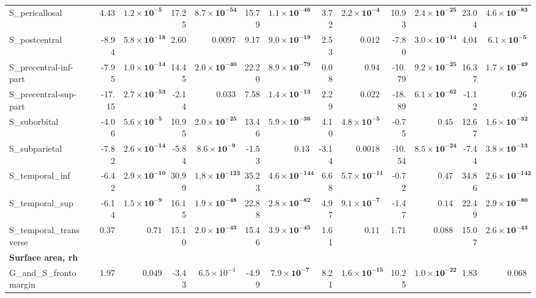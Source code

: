 {\begin{longtable}{llrrrrrrrrrrrr}
S\_pericallosal &  & 4.43 & $\mathbf{1.2{\times}10^{-5}}$ & 17.25 & $\mathbf{8.7{\times}10^{-54}}$ & 15.79 & $\mathbf{1.1{\times}10^{-46}}$ & 3.72 & $\mathbf{2.2{\times}10^{-4}}$ & 10.93 & $\mathbf{2.4{\times}10^{-25}}$ & 23.04 & $\mathbf{4.6{\times}10^{-83}}$ \\
S\_postcentral &  & -8.94 & $\mathbf{5.8{\times}10^{-18}}$ & 2.60 & $0.0097$ & 9.17 & $\mathbf{9.0{\times}10^{-19}}$ & 2.53 & $0.012$ & -7.80 & $\mathbf{3.0{\times}10^{-14}}$ & 4.04 & $\mathbf{6.1{\times}10^{-5}}$ \\
S\_precentral-inf-part &  & -7.95 & $\mathbf{1.0{\times}10^{-14}}$ & 14.45 & $\mathbf{2.0{\times}10^{-40}}$ & 22.20 & $\mathbf{8.9{\times}10^{-79}}$ & 0.08 & $0.94$ & -10.79 & $\mathbf{9.2{\times}10^{-25}}$ & 16.37 & $\mathbf{1.7{\times}10^{-49}}$ \\
S\_precentral-sup-part &  & -17.15 & $\mathbf{2.7{\times}10^{-53}}$ & -2.14 & $0.033$ & 7.58 & $\mathbf{1.4{\times}10^{-13}}$ & 2.29 & $0.022$ & -18.89 & $\mathbf{6.1{\times}10^{-62}}$ & -1.12 & $0.26$ \\
S\_suborbital &  & -4.06 & $\mathbf{5.6{\times}10^{-5}}$ & 10.95 & $\mathbf{2.0{\times}10^{-25}}$ & 13.46 & $\mathbf{5.9{\times}10^{-36}}$ & 4.10 & $\mathbf{4.8{\times}10^{-5}}$ & -0.75 & $0.45$ & 12.67 & $\mathbf{1.6{\times}10^{-32}}$ \\
S\_subparietal &  & -7.82 & $\mathbf{2.6{\times}10^{-14}}$ & -5.84 & $\mathbf{8.6{\times}10^{-9}}$ & -1.53 & $0.13$ & -3.14 & $0.0018$ & -10.54 & $\mathbf{8.5{\times}10^{-24}}$ & -7.44 & $\mathbf{3.8{\times}10^{-13}}$ \\
S\_temporal\_inf &  & -6.42 & $\mathbf{2.9{\times}10^{-10}}$ & 30.99 & $\mathbf{1.8{\times}10^{-123}}$ & 35.23 & $\mathbf{4.6{\times}10^{-144}}$ & 6.68 & $\mathbf{5.7{\times}10^{-11}}$ & -0.72 & $0.47$ & 34.86 & $\mathbf{2.6{\times}10^{-142}}$ \\
S\_temporal\_sup &  & -6.14 & $\mathbf{1.5{\times}10^{-9}}$ & 16.15 & $\mathbf{1.9{\times}10^{-48}}$ & 22.88 & $\mathbf{2.8{\times}10^{-82}}$ & 4.97 & $\mathbf{9.1{\times}10^{-7}}$ & -1.47 & $0.14$ & 22.49 & $\mathbf{2.9{\times}10^{-80}}$ \\
S\_temporal\_transverse &  & 0.37 & $0.71$ & 15.10 & $\mathbf{2.0{\times}10^{-43}}$ & 15.46 & $\mathbf{3.9{\times}10^{-45}}$ & 1.61 & $0.11$ & 1.71 & $0.088$ & 15.07 & $\mathbf{2.6{\times}10^{-43}}$ \\
\midrule\multicolumn{14}{l}{\textbf{Surface area, rh}} \\
G\_and\_S\_frontomargin &  & 1.97 & $0.049$ & -3.43 & $6.5{\times}10^{-4}$ & -4.99 & $\mathbf{7.9{\times}10^{-7}}$ & 8.21 & $\mathbf{1.6{\times}10^{-15}}$ & 10.25 & $\mathbf{1.0{\times}10^{-22}}$ & 1.83 & $0.068$ \\

\end{longtable}}
